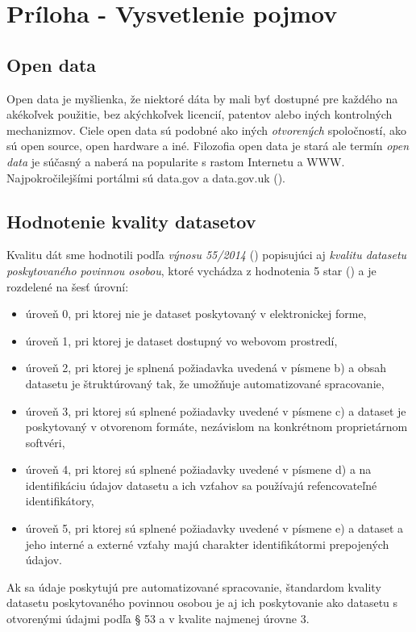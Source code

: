 \documentclass[12pt,a4paper]{article}
\begin{document}
\section*{Príloha - Vysvetlenie pojmov} 
\subsection*{Open data} 
\label{opendata} 
Open data je myšlienka, že niektoré dáta by mali byť dostupné pre každého na akékoľvek použitie, bez akýchkoľvek licencií, patentov alebo iných kontrolných mechanizmov. Ciele open data sú podobné ako iných \emph{otvorených} spoločností, ako sú open source, open hardware a iné. Filozofia open data je stará ale termín \emph{open data} je súčasný a naberá na popularite s rastom Internetu a WWW. Najpokročilejšími portálmi sú data.gov a data.gov.uk (\cite{opendata-wiki}). 

\subsection*{Hodnotenie kvality datasetov}
\label{zakon-kvalita} 
Kvalitu dát sme hodnotili podľa \emph{výnosu 55/2014} (\cite{kvalita}) popisujúci aj \emph{kvalitu datasetu poskytovaného povinnou osobou}, ktoré vychádza z hodnotenia 5 star (\cite{5star}) a je rozdelené na šesť úrovní: 
\begin{itemize} 
\item úroveň 0, pri ktorej nie je dataset poskytovaný
v elektronickej forme,
\item úroveň 1, pri ktorej je dataset dostupný vo webovom
prostredí,
\item úroveň 2, pri ktorej je splnená požiadavka uvedená
v písmene b) a obsah datasetu je štruktúrovaný tak,
že umožňuje automatizované spracovanie,
\item úroveň 3, pri ktorej sú splnené požiadavky uvedené
v písmene c) a dataset je poskytovaný v otvorenom
formáte, nezávislom na konkrétnom proprietárnom
softvéri,
\item úroveň 4, pri ktorej sú splnené požiadavky uvedené
v písmene d) a na identifikáciu údajov datasetu a ich
vzťahov sa používajú refencovateľné identifikátory,
\item úroveň 5, pri ktorej sú splnené požiadavky uvedené
v písmene e) a dataset a jeho interné a externé
vzťahy majú charakter identifikátormi prepojených
údajov.
\end{itemize} 

Ak sa údaje poskytujú pre automatizované spracovanie, štandardom kvality datasetu poskytovaného
povinnou osobou je aj ich poskytovanie ako datasetu s otvorenými údajmi podľa § 53 a v kvalite najmenej úrovne 3.
\end{document}
